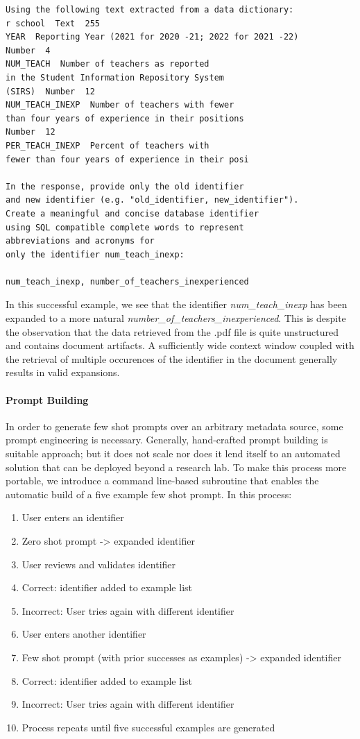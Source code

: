 \begin{verbatim}
Using the following text extracted from a data dictionary:
r school  Text  255
YEAR  Reporting Year (2021 for 2020 -21; 2022 for 2021 -22) 
Number  4
NUM_TEACH  Number of teachers as reported 
in the Student Information Repository System
(SIRS)  Number  12
NUM_TEACH_INEXP  Number of teachers with fewer 
than four years of experience in their positions  
Number  12
PER_TEACH_INEXP  Percent of teachers with 
fewer than four years of experience in their posi

In the response, provide only the old identifier 
and new identifier (e.g. "old_identifier, new_identifier").
Create a meaningful and concise database identifier 
using SQL compatible complete words to represent 
abbreviations and acronyms for 
only the identifier num_teach_inexp:

num_teach_inexp, number_of_teachers_inexperienced
\end{verbatim}

In this successful example, we see that the identifier \emph{num\_teach\_inexp} has been expanded to a more natural \emph{number\_of\_teachers\_inexperienced}.
This is despite the observation that the data retrieved from the .pdf file is quite unstructured and contains document artifacts.
A sufficiently wide context window coupled with the retrieval of multiple occurences of the identifier in the document generally results in valid expansions.

\paragraph{\textbf{Prompt Building}}
In order to generate few shot prompts over an arbitrary metadata source, some prompt engineering is necessary.
Generally, hand-crafted prompt building is suitable approach; but it does not scale nor does it lend itself to an automated solution that can be deployed beyond a research lab.
To make this process more portable, we introduce a command line-based subroutine that enables the automatic build of a five example few shot prompt.
In this process:
\begin{enumerate}
  \item User enters an identifier
  \item Zero shot prompt -> expanded identifier
  \item User reviews and validates identifier
  \item Correct: identifier added to example list
  \item Incorrect: User tries again with different identifier
  \item User enters another identifier
  \item Few shot prompt (with prior successes as examples) -> expanded identifier
  \item Correct: identifier added to example list
  \item Incorrect: User tries again with different identifier
  \item Process repeats until five successful examples are generated
\end{enumerate}

